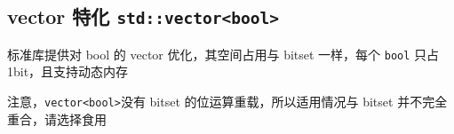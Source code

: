 \subsection{vector 特化 \texttt{std::vector<bool>}}

标准库提供对 bool 的 vector 优化，其空间占用与 bitset 一样，每个 \texttt{bool} 只占 1bit，且支持动态内存

注意，\texttt{vector<bool>}没有 bitset 的位运算重载，所以适用情况与 bitset 并不完全重合，请选择食用
